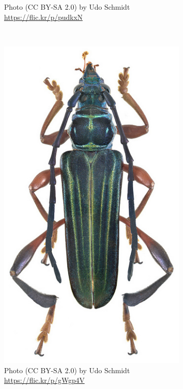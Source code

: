\documentclass[letterpaper, 11pt]{article}
\begin{document}
\begin{figure}[ht!]
\begin{subfigure}[ht!]{0.25\textwidth}
  \caption{Photo (CC BY-SA 2.0) by Udo Schmidt \url{https://flic.kr/p/pudkxN}}
  \label{fig:cerambycid1}
\end{subfigure}
    ~
 \begin{subfigure}[ht!]{0.27\textwidth}
    \includegraphics[width=\textwidth]{Cerambycid2}
  \caption{Photo (CC BY-SA 2.0) by Udo Schmidt \url{https://flic.kr/p/gWgp4V}}
  \label{fig:cerambycid2}
\end{subfigure}
    ~
\begin{subfigure}[ht!]{0.27\textwidth}

\end{subfigure}
\end{figure}
\end{document}
